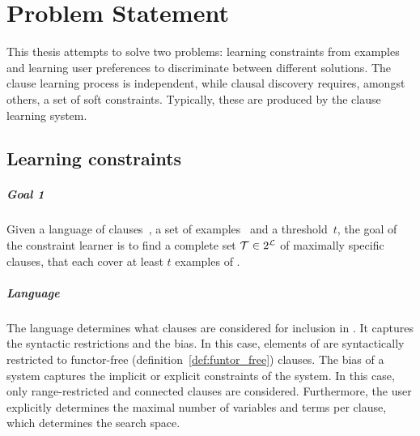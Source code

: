 \chapter{Problem Statement}
\label{cha:problem_statement}




This thesis attempts to solve two problems: learning constraints from examples and learning user preferences to discriminate between different solutions.
The clause learning process is independent, while clausal discovery requires, amongst others, a set of soft constraints.
Typically, these are produced by the clause learning system.

\section{Learning constraints}
\label{sec:learning_constraints}

\begin{framed}
	\noindent
	\begin{minipage}{\textwidth}
		\paragraph{Goal 1}
		Given a language of clauses~, a set of examples~ and a threshold~$t$, the goal of the constraint learner is to find a complete set $\mathcal{T} \in 2^{\mathcal{L}}$ of maximally specific clauses, that each cover at least $t$ examples of .
	\end{minipage}
\end{framed}

\paragraph{Language}
The language  determines what clauses are considered for inclusion in .
It captures the syntactic restrictions and the bias.
In this case, elements of  are syntactically restricted to functor-free (definition~\ref{def:funtor_free}) clauses.
The bias of a system captures the implicit or explicit constraints of the system.
In this case, only range-restricted and connected clauses are considered.
Furthermore, the user explicitly determines the maximal number of variables and terms per clause, which determines the search space.

